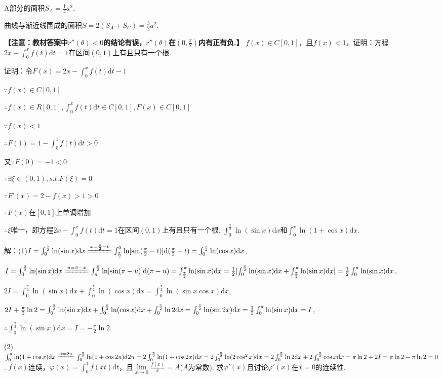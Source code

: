\documentclass[12pt,UTF8]{ctexart}
\begin{document}
\begin{enumerate}
A部分的面积$S_A=\frac14a^2$,

曲线与渐近线围成的面积$S=2(S_A+S_C)=\frac32a^2$.

{\bf【注意：教材答案中$r''(\theta)<0$的结论有误，$r''(\theta)$在$(0,\frac\pi2)$内有正有负.】}
$f(x)\in C[0,1]$，且$f(x)<1$，证明：方程$2x-\int_0^xf(t)\mathrm dt=1$在区间$(0,1)$上有且只有一个根.

证明：令$F(x)=2x-\int_0^xf(t)\mathrm dt-1$

$\because f(x)\in C[0,1]$

$\therefore f(x)\in R[0,1],\int_0^xf(t)\mathrm dt\in C[0,1],F(x)\in C[0,1]$

$\because f(x)<1$

$\therefore F(1)=1-\int_0^1f(t)\mathrm dt>0$

又$\because F(0)=-1<0$

$\therefore\exists\xi\in(0,1),s.t.F(\xi)=0$

$\because F'(x)=2-f(x)>1>0$

$\therefore F(x)$在$[0,1]$上单调增加

$\therefore\xi$唯一，即方程$2x-\int_0^xf(t)\mathrm dt=1$在区间$(0,1)$上有且只有一个根.
$\int_0^{\frac\pi2}\ln(\sin x)\mathrm dx$和$\int_0^\pi\ln(1+\cos x)\mathrm dx$.

解：(1)$I=\int_0^{\frac\pi2}\ln(\sin x)\mathrm dx\xlongequal{x=\frac\pi2-t}\int_{\frac\pi2}^0\ln[\sin(\frac\pi2-t)]\mathrm d(\frac\pi2-t)=\int_0^{\frac\pi2}\ln(\cos x)\mathrm dx$,

$I=\int_0^{\frac\pi2}\ln(\sin x)\mathrm dx\xlongequal{u=\pi-x}\int_\pi^{\frac\pi2}\ln[\sin(\pi-u)]\mathrm d(\pi-u)=\int_{\frac\pi2}^\pi\ln(\sin x)\mathrm dx\\
=\frac12[\int_0^{\frac\pi2}\ln(\sin x)\mathrm dx+\int_{\frac\pi2}^\pi\ln(\sin x)\mathrm dx]=\frac12\int_0^\pi\ln(\sin x)\mathrm dx$,

$2I=\int_0^{\frac\pi2}\ln(\sin x)\mathrm dx+\int_0^{\frac\pi2}\ln(\cos x)\mathrm dx=\int_0^{\frac\pi2}\ln(\sin x\cos x)\mathrm dx$,

$2I+\frac\pi2\ln2=\int_0^{\frac\pi2}\ln(\sin x)\mathrm dx+\int_0^{\frac\pi2}\ln(\cos x)\mathrm dx+\int_0^{\frac\pi2}\ln2\mathrm dx=\int_0^{\frac\pi2}\ln(\sin2x)\mathrm dx\\
=\frac12\int_0^\pi\ln(\sin x)\mathrm dx=I$,

$\therefore\int_0^{\frac\pi2}\ln(\sin x)\mathrm dx=I=-\frac\pi2\ln2$.

(2)$\int_0^\pi\ln(1+\cos x)\mathrm dx\xlongequal{x=2u}\int_0^{\frac\pi2}\ln(1+\cos2u)\mathrm d2u=2\int_0^{\frac\pi2}\ln(1+\cos2x)\mathrm dx\\
=2\int_0^{\frac\pi2}\ln(2\cos^2x)\mathrm dx=2\int_0^{\frac\pi2}\ln2\mathrm dx+2\int_0^{\frac\pi2}\cos x\mathrm dx=\pi\ln2+2I=\pi\ln2-\pi\ln2=0$.
$f(x)$连续，$\varphi(x)=\int_0^1f(xt)\mathrm dt$，且$\lim\limits_{x\rightarrow0}\frac{f(x)}x=A$($A$为常数). 求$\varphi'(x)$且讨论$\varphi'(x)$在$x=0$的连续性.


\end{enumerate}
\end{document}
